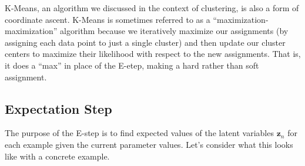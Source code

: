 \begin{warning}
    K-Means, an algorithm we discussed in the context of clustering, is also a form of coordinate ascent. K-Means is sometimes referred to as a  ``maximization-maximization'' algorithm because we iteratively maximize our assignments (by assigning each data point to just a single cluster) and then update our cluster centers to maximize their likelihood with respect to the new assignments. That is, it does a ``max'' in place of the E-etep, making a hard rather than soft assignment.
\end{warning}

\subsection{Expectation Step}

The purpose of the E-step is to find expected values of the latent variables $\textbf{z}_n$ for each example given the current parameter values. Let's consider what this looks like with a concrete example.


